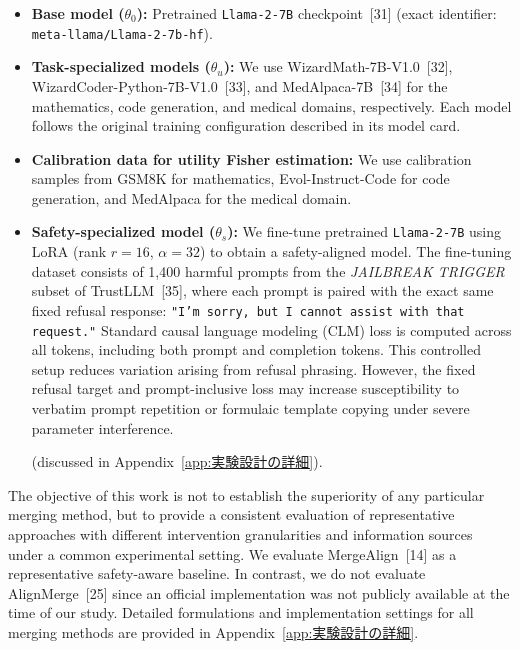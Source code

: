 \documentclass{article}
\begin{document}
\begin{itemize}
    \item \textbf{Base model ($\theta_0$):} Pretrained \texttt{Llama-2-7B} checkpoint~[31] (exact identifier: \texttt{meta-llama/Llama-2-7b-hf}).

    \item \textbf{Task-specialized models ($\theta_u$):} We use WizardMath-7B-V1.0~[32], WizardCoder-Python-7B-V1.0~[33], and MedAlpaca-7B~[34] for the mathematics, code generation, and medical domains, respectively. Each model follows the original training configuration described in its model card.

    \item \textbf{Calibration data for utility Fisher estimation:} We use calibration samples from GSM8K for mathematics, Evol-Instruct-Code for code generation, and MedAlpaca for the medical domain.


    \item \textbf{Safety-specialized model ($\theta_s$):} We fine-tune pretrained \texttt{Llama-2-7B} using LoRA (rank $r=16$, $\alpha=32$) to obtain a safety-aligned model. The fine-tuning dataset consists of 1,400 harmful prompts from the \textit{JAILBREAK TRIGGER} subset of TrustLLM~[35], where each prompt is paired with the exact same fixed refusal response: \texttt{"I'm sorry, but I cannot assist with that request."} Standard causal language modeling (CLM) loss is computed across all tokens, including both prompt and completion tokens. This controlled setup reduces variation arising from refusal phrasing. However, the fixed refusal target and prompt-inclusive loss may increase susceptibility to verbatim prompt repetition or formulaic template copying under severe parameter interference.
    
    (discussed in Appendix~\ref{app:実験設計の詳細}).
\end{itemize}

The objective of this work is not to establish the superiority of any particular merging method, but to provide a consistent evaluation of representative approaches with different intervention granularities and information sources under a common experimental setting. We evaluate MergeAlign~[14] as a representative safety-aware baseline. In contrast, we do not evaluate AlignMerge~[25] since an official implementation was not publicly available at the time of our study. Detailed formulations and implementation settings for all merging methods are provided in Appendix~\ref{app:実験設計の詳細}.
\end{document}
